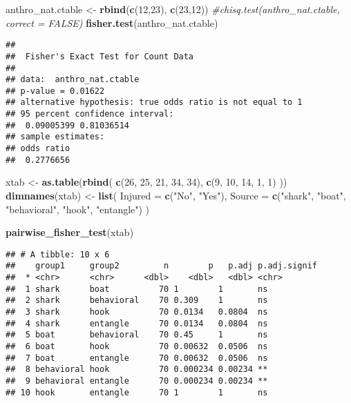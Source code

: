 \documentclass[
]{article}
\newenvironment{Shaded}{\begin{snugshade}}{\end{snugshade}}
\newcommand{\AttributeTok}[1]{\textcolor[rgb]{0.13,0.29,0.53}{#1}}
\newcommand{\CommentTok}[1]{\textcolor[rgb]{0.56,0.35,0.01}{\textit{#1}}}
\newcommand{\DecValTok}[1]{\textcolor[rgb]{0.00,0.00,0.81}{#1}}
\newcommand{\FunctionTok}[1]{\textcolor[rgb]{0.13,0.29,0.53}{\textbf{#1}}}
\newcommand{\NormalTok}[1]{#1}
\newcommand{\OtherTok}[1]{\textcolor[rgb]{0.56,0.35,0.01}{#1}}
\newcommand{\StringTok}[1]{\textcolor[rgb]{0.31,0.60,0.02}{#1}}
\begin{document}
\begin{Shaded}
\begin{Highlighting}[]
\NormalTok{anthro\_nat.ctable }\OtherTok{\textless{}{-}} \FunctionTok{rbind}\NormalTok{(}\FunctionTok{c}\NormalTok{(}\DecValTok{12}\NormalTok{,}\DecValTok{23}\NormalTok{), }\FunctionTok{c}\NormalTok{(}\DecValTok{23}\NormalTok{,}\DecValTok{12}\NormalTok{))}
\CommentTok{\#chisq.test(anthro\_nat.ctable, correct = FALSE)}
\FunctionTok{fisher.test}\NormalTok{(anthro\_nat.ctable)}
\end{Highlighting}
\end{Shaded}

\begin{verbatim}
## 
##  Fisher's Exact Test for Count Data
## 
## data:  anthro_nat.ctable
## p-value = 0.01622
## alternative hypothesis: true odds ratio is not equal to 1
## 95 percent confidence interval:
##  0.09005399 0.81036514
## sample estimates:
## odds ratio 
##  0.2776656
\end{verbatim}

\begin{Shaded}
\begin{Highlighting}[]
\NormalTok{xtab }\OtherTok{\textless{}{-}} \FunctionTok{as.table}\NormalTok{(}\FunctionTok{rbind}\NormalTok{(}
  \FunctionTok{c}\NormalTok{(}\DecValTok{26}\NormalTok{, }\DecValTok{25}\NormalTok{, }\DecValTok{21}\NormalTok{, }\DecValTok{34}\NormalTok{, }\DecValTok{34}\NormalTok{),}
  \FunctionTok{c}\NormalTok{(}\DecValTok{9}\NormalTok{, }\DecValTok{10}\NormalTok{, }\DecValTok{14}\NormalTok{, }\DecValTok{1}\NormalTok{, }\DecValTok{1}\NormalTok{)}
\NormalTok{))}
\FunctionTok{dimnames}\NormalTok{(xtab) }\OtherTok{\textless{}{-}} \FunctionTok{list}\NormalTok{(}
  \AttributeTok{Injured =} \FunctionTok{c}\NormalTok{(}\StringTok{"No"}\NormalTok{, }\StringTok{"Yes"}\NormalTok{),}
  \AttributeTok{Source =} \FunctionTok{c}\NormalTok{(}\StringTok{"shark"}\NormalTok{, }\StringTok{"boat"}\NormalTok{, }\StringTok{"behavioral"}\NormalTok{, }\StringTok{"hook"}\NormalTok{, }\StringTok{"entangle"}\NormalTok{)}
\NormalTok{  )}

\FunctionTok{pairwise\_fisher\_test}\NormalTok{(xtab)}
\end{Highlighting}
\end{Shaded}

\begin{verbatim}
## # A tibble: 10 x 6
##    group1     group2         n        p   p.adj p.adj.signif
##  * <chr>      <chr>      <dbl>    <dbl>   <dbl> <chr>       
##  1 shark      boat          70 1        1       ns          
##  2 shark      behavioral    70 0.309    1       ns          
##  3 shark      hook          70 0.0134   0.0804  ns          
##  4 shark      entangle      70 0.0134   0.0804  ns          
##  5 boat       behavioral    70 0.45     1       ns          
##  6 boat       hook          70 0.00632  0.0506  ns          
##  7 boat       entangle      70 0.00632  0.0506  ns          
##  8 behavioral hook          70 0.000234 0.00234 **          
##  9 behavioral entangle      70 0.000234 0.00234 **          
## 10 hook       entangle      70 1        1       ns
\end{verbatim}
\end{document}
